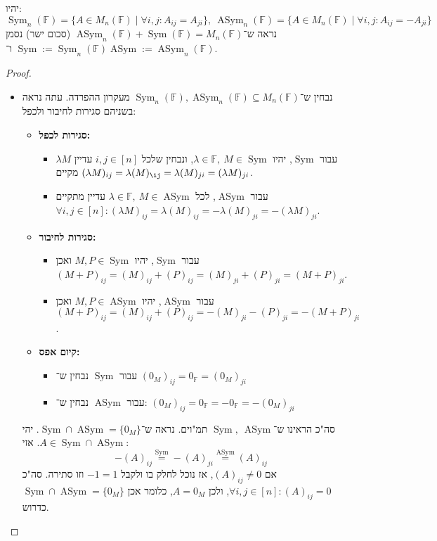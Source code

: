 \documentclass[]{article}
\DeclareMathOperator{\Sym}     {Sym}
\DeclareMathOperator{\Asym}    {ASym}
\newcommand\F         {\mathbb{F}}
\newcommand\co        {\colon}
\renewcommand\lg      {\lambda}
\theoremstyle{definition}
\newcommand\ASym      {\Asym}
\begin{document}
    יהיו: 
    \[ \Sym_n(\F) = \{A \in M_n(\F) \mid \forall i, j \co A_{ij} = A_{ji}\}, \ \ASym_n(\F) = \{A \in M_n(\F) \mid \forall i, j \co A_{ij} = -A_{ji}\} \]
    נראה ש־$\ASym_n(\F) + \Sym(\F) = M_n(\F)$ (סכום ישר) נסמן $\Sym := \Sym_n(\F)$ ו־$\ASym := \ASym_n(\F)$. 
    \begin{proof}\,
    \begin{itemize}
        \item נבחין ש־$\Sym_n(\F), \ASym_n(\F) \subseteq M_n(\F)$ מעקרון ההפרדה. עתה נראה בשניהם סגירות לחיבור ולכפל: 
        \begin{itemize}
            \item \textbf{סגירות לכפל: }
            \begin{itemize}
                \item עבור $\Sym$, יהיו $\lg \in \F, \ M \in \Sym$, ונבחין שלכל $i, j \in [n]$ עדיין $\lg M$ מקיים $(\lg M)_{ij} = \lg (M)_{\ij} = \lg (M)_{ji} = (\lg M)_{ji}$. 
                \item עבור $\ASym$, לכל $\lg \in \F , \ M \in \ASym$ עדיין מתקיים $\forall i, j \in [n]\co (\lg M)_{ij} = \lg (M)_{ij} = -\lg (M)_{ji} = -(\lg M)_{ji}$. 
            \end{itemize}
            \item \textbf{סגירות לחיבור: }
            \begin{itemize}
                \item עבור $\Sym$, יהיו $M, P \in \Sym$ ואכן $(M + P)_{ij} = (M)_{ij} + (P)_{ij} = (M)_{ji} + (P)_{ji} = (M + P)_{ji}$. 
                \item עבור $\ASym$, יהיו $M, P \in \ASym$ ואכן $(M + P)_{ij} = (M)_{ij} + (P)_{ij} = -(M)_{ji} - (P)_{ji} = -(M + P)_{ji}$. 
            \end{itemize}
            \item \textbf{קיום אפס: }
            \begin{itemize}
                \item עבור $\Sym$ נבחין ש־
                $(0_M)_{ij} = 0_\F = (0_M)_{ji}$
                \item עבור $\ASym$ נבחין ש־: 
                $(0_M)_{ij} = 0_\F = -0_\F = -(0_M)_{ji}$
            \end{itemize}
        \end{itemize}
        סה"כ הראינו ש־$\Sym, \ \ASym$ תמ"וים. נראה ש־$\Sym \cap \ASym = \{0_M\}$. יהי $A \in \Sym \cap \ASym$. אזי: 
        \[ -(A)_{ij} \!\overset{\Sym}{=}\! -(A)_{ji} \!\overset{\ASym}{=}\! (A)_{ij} \]
        אם $(A)_{ij} \neq 0$, אז נוכל לחלק בו ולקבל $-1 = 1$ וזו סתירה. סה"כ $\forall i, j \in [n] \co (A)_{ij} = 0$, ולכן $A = 0_M$, כלומר אכן $\Sym \cap \ASym = \{0_M\}$ כדרוש. 

\end{itemize}
\end{proof}
\end{document}
